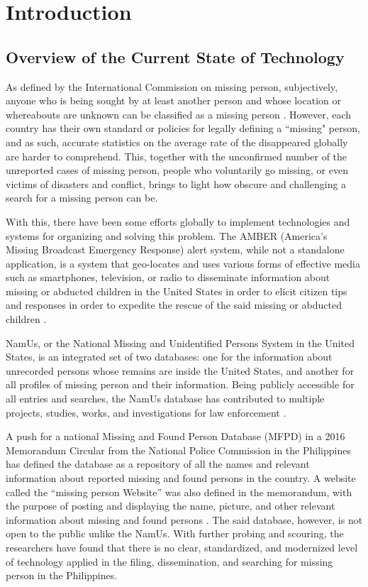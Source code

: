 \chapter{Introduction}
\label{sec:researchdesc}    %

\section{Overview of the Current State of Technology}
\label{sec:overview}
As defined by the International Commission on missing person, subjectively, anyone who is being sought by at least another person and whose location or whereabouts are unknown can be classified as a missing person \cite{icmpMissing}. However, each country has their own standard or policies for legally defining a ``missing" person, and as such, accurate statistics on the average rate of the disappeared globally are harder to comprehend. This, together with the unconfirmed number of the unreported cases of missing person, people who voluntarily go missing, or even victims of disasters and conflict, brings to light how obscure and challenging a search for a missing person can be.

With this, there have been some efforts globally to implement technologies and systems for organizing and solving this problem. The AMBER (America's Missing Broadcast Emergency Response) alert system, while not a standalone application, is a system that geo-locates and uses various forms of effective media such as smartphones, television, or radio to disseminate information about missing or abducted children in the United States in order to elicit citizen tips and responses in order to expedite the rescue of the said missing or abducted children \cite{griffin2007preliminary}.

NamUs, or the National Missing and Unidentified Persons System in the United States, is an integrated set of two databases: one for the information about unrecorded persons whose remains are inside the United States, and another for all profiles of missing person and their information. Being publicly accessible for all entries and searches, the NamUs database has contributed to multiple 
projects, studies, works, and investigations for law enforcement \cite{murray2018history}. 

A push for a national Missing and Found Person Database (MFPD) in a 2016 Memorandum Circular from the National Police Commission in the Philippines has defined the database as a repository of all the names and relevant information about reported missing and found persons in the country. A website called the “missing person Website” was also defined in the memorandum, with the purpose of posting and displaying the name, picture, and other relevant information about missing and found persons 
\cite{NationalPoliceCommission}. The said database, however, is not open to the public unlike the NamUs. With further probing and scouring, the researchers have found that there is no clear, standardized, and modernized level of technology applied in the filing, dissemination, and searching for missing person in the Philippines.

